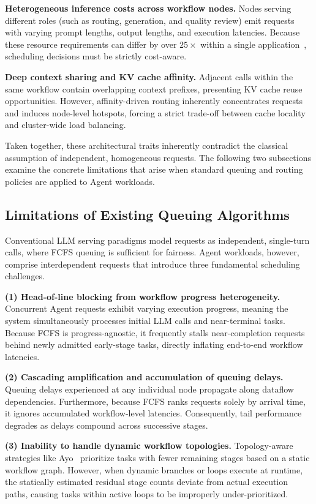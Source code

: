 \documentclass[sigconf,review,anonymous]{acmart}
\begin{document}
\textbf{Heterogeneous inference costs across workflow nodes.}
Nodes serving different roles (such as routing, generation, and quality review) emit 
requests with varying prompt lengths, output lengths, and execution latencies. 
Because these resource requirements can differ by over $25\times$ within a single 
application~\cite{chen2025kairos}, scheduling decisions must be strictly cost-aware.

\textbf{Deep context sharing and KV cache affinity.}
Adjacent calls within the same workflow contain overlapping context prefixes, 
presenting KV cache reuse opportunities. However, affinity-driven routing inherently 
concentrates requests and induces node-level hotspots, forcing a strict trade-off 
between cache locality and cluster-wide load balancing.

Taken together, these architectural traits inherently contradict the classical assumption 
of independent, homogeneous requests. The following two subsections examine the concrete 
limitations that arise when standard queuing and routing policies are applied to Agent 
workloads.

\subsection{Limitations of Existing Queuing Algorithms}
\label{subsec:queue-challenges}

Conventional LLM serving paradigms model requests as independent, single-turn calls, 
where FCFS queuing is sufficient for fairness. Agent workloads, 
however, comprise interdependent requests that introduce three fundamental scheduling 
challenges.

\noindent\textbf{(1) Head-of-line blocking from workflow progress heterogeneity.}
Concurrent Agent requests exhibit varying execution progress, meaning the system 
simultaneously processes initial LLM calls and near-terminal tasks. Because FCFS 
is progress-agnostic, it frequently stalls near-completion requests behind newly 
admitted early-stage tasks, directly inflating end-to-end workflow latencies.

\noindent\textbf{(2) Cascading amplification and accumulation of queuing delays.}
Queuing delays experienced at any individual node propagate along dataflow dependencies. 
Furthermore, because FCFS ranks requests solely by arrival time, it ignores accumulated 
workflow-level latencies. Consequently, tail performance degrades as delays compound 
across successive stages.

\noindent\textbf{(3) Inability to handle dynamic workflow topologies.}
Topology-aware strategies like Ayo~\cite{tan2025towards} prioritize tasks with fewer 
remaining stages based on a static workflow graph. However, when dynamic branches or 
loops execute at runtime, the statically estimated residual stage counts deviate from 
actual execution paths, causing tasks within active loops to be improperly 
under-prioritized.
\end{document}
